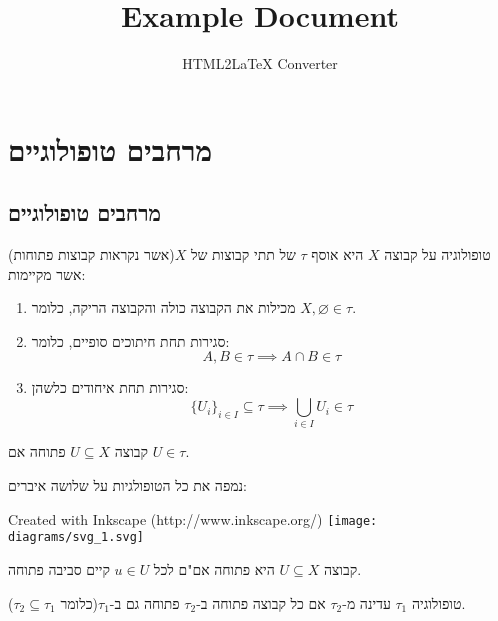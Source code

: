 \documentclass{tstextbook}
\begin{document}
\title{Example Document}
\author{HTML2LaTeX Converter}
\maketitle

\chapter{מרחבים טופולוגיים}

\section{מרחבים טופולוגיים}

\begin{definition}[טופולוגיה]
טופולוגיה על קבוצה \(X\) היא אוסף \(\tau\) של תתי קבוצות של \(X\)(אשר נקראות קבוצות פתוחות) אשר מקיימות:

  \begin{enumerate}
    \item מכילות את הקבוצה כולה והקבוצה הריקה, כלומר \(X,\varnothing  \in \tau\). 


    \item סגירות תחת חיתוכים סופיים, כלומר: 
$${A,B\in\tau}\implies A\cap B\in\tau$$


    \item סגירות תחת איחודים כלשהן: 
$$\{U_{i}\}_{i\in I}\subseteq\tau\implies\bigcup_{i\in I}U_{i}\in\tau$$


  \end{enumerate}
\end{definition}
\begin{definition}
קבוצה \(U\subseteq X\) פתוחה אם \(U\in \tau\).

\end{definition}
\begin{example}
נמפה את כל הטופולגיות על שלושה איברים:

 Created with Inkscape (http://www.inkscape.org/) \texttt{[image: diagrams/svg\_1.svg]}
\end{example}
\begin{proposition}
קבוצה \(U\subseteq X\) היא פתוחה אם"ם לכל \(u \in U\) קיים סביבה פתוחה.

\end{proposition}
\begin{definition}
טופולוגיה \(\tau_{1}\) עדינה מ-\(\tau_{2}\) אם כל קבוצה פתוחה ב-\(\tau_{2}\) פתוחה גם ב-\(\tau_{1}\)(כלומר \(\tau_{2}\subseteq \tau_{1}\)).

\end{definition}
\end{document}
